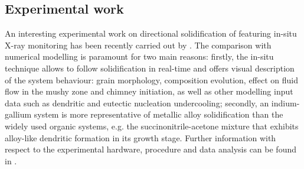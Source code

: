 \subsection{Experimental work}  \label{sec:freckle_exp}

An interesting experimental work on directional solidification of 
featuring in-situ X-ray monitoring has been recently carried out by \citet{shevchenko_chimney_2013}. 
The comparison with numerical modelling is paramount for two main reasons: firstly, the in-situ technique allows to follow solidification in real-time 
and offers visual description of the system behaviour: grain morphology, composition evolution, effect on fluid flow in the 
mushy zone and chimney initiation, as well as other modelling input data such as dendritic and eutectic nucleation undercooling; 
secondly, an indium-gallium system is more representative of metallic alloy solidification than the widely used organic systems, 
e.g. the succinonitrile-acetone mixture that exhibits alloy-like dendritic formation in its growth stage. Further information with respect 
to the experimental hardware, procedure and data analysis can be found in \citep{boden_x-ray_2008,shevchenko_chimney_2013}.

